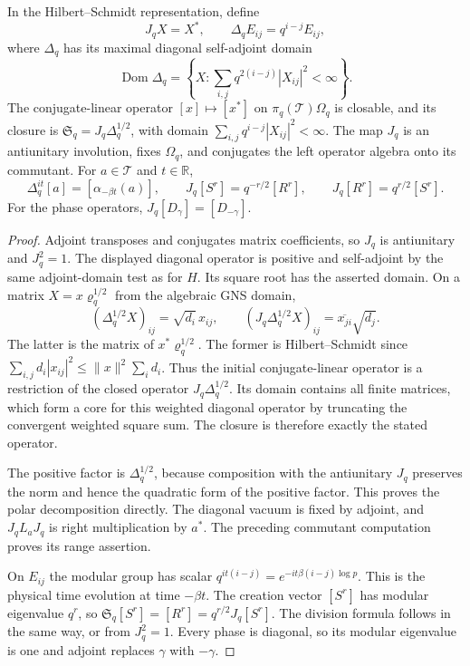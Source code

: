 \begin{theorem}
\label{v4-arith:thermal:modular}
In the Hilbert--Schmidt representation, define
\[
 J_qX=X^*,\qquad
 \Delta_q E_{ij}=q^{i-j}E_{ij},
\]
where $\Delta_q$ has its maximal diagonal self-adjoint domain
\[
 \operatorname{Dom}\Delta_q
   =\left\{X:\sum_{i,j}q^{2(i-j)}|X_{ij}|^2<\infty\right\}.
\]
The conjugate-linear operator $[x]\mapsto[x^*]$ on
$\pi_q(\mathcal T)\Omega_q$ is closable, and its closure is
$\mathfrak S_q=J_q\Delta_q^{1/2}$, with domain
$\sum_{i,j}q^{i-j}|X_{ij}|^2<\infty$.
The map $J_q$ is an antiunitary involution, fixes $\Omega_q$, and
conjugates the left operator algebra onto its commutant.
For $a\in\mathcal T$ and $t\in\mathbb R$,
\begin{equation}
 \Delta_q^{it}[a]=[\alpha_{-\beta t}(a)],
 \qquad
 J_q[S^r]=q^{-r/2}[R^r],\qquad
 J_q[R^r]=q^{r/2}[S^r].
 \label{v4-arith:thermal:modular-formulas}
\end{equation}
For the phase operators, $J_q[D_\gamma]=[D_{-\gamma}]$.
\end{theorem}

\begin{proof}
Adjoint transposes and conjugates matrix coefficients, so $J_q$
is antiunitary and $J_q^2=1$. The displayed diagonal operator
is positive and self-adjoint by the same adjoint-domain test as
for $H$. Its square root has the asserted domain. On a matrix
$X=x\varrho_q^{1/2}$ from the algebraic GNS domain,
\[
 (\Delta_q^{1/2}X)_{ij}=\sqrt{d_i}\,x_{ij},
 \qquad
 (J_q\Delta_q^{1/2}X)_{ij}
       =\overline{x_{ji}}\sqrt{d_j}.
\]
The latter is the matrix of $x^*\varrho_q^{1/2}$. The former is
Hilbert--Schmidt since
$\sum_{i,j}d_i|x_{ij}|^2\leq\|x\|^2\sum_i d_i$.
Thus the initial conjugate-linear operator is a restriction of
the closed operator $J_q\Delta_q^{1/2}$. Its domain contains all
finite matrices, which form a core for this weighted diagonal
operator by truncating the convergent weighted square sum.
The closure is therefore exactly the stated operator.

The positive factor is $\Delta_q^{1/2}$, because composition
with the antiunitary $J_q$ preserves the norm and hence the
quadratic form of the positive factor. This proves the polar
decomposition directly. The diagonal vacuum is fixed by adjoint,
and $J_qL_aJ_q$ is right multiplication by $a^*$. The preceding
commutant computation proves its range assertion.

On $E_{ij}$ the modular group has scalar
$q^{it(i-j)}=e^{-it\beta(i-j)\log p}$. This is the physical
time evolution at time $-\beta t$. The creation vector $[S^r]$
has modular eigenvalue $q^r$, so
$\mathfrak S_q[S^r]=[R^r]=q^{r/2}J_q[S^r]$.
The division formula follows in the same way, or from $J_q^2=1$.
Every phase is diagonal, so its modular eigenvalue is one and
adjoint replaces $\gamma$ with $-\gamma$.
\end{proof}

